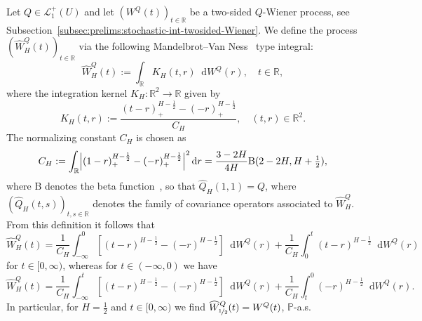 \documentclass[reqno]{amsart}
\numberwithin{equation}{section}
\newcommand{\bbP}{\mathbb{P}}
\newcommand{\bbR}{\mathbb{R}}
\newcommand{\R}{\mathbb{R}}
\newcommand{\rd}{\mathop{}\!\mathrm{d}}
\newcommand{\from}{\colon}
\newcommand{\LO}{\mathscr L}
\theoremstyle{remark}
\theoremstyle{definition}
\begin{document}
Let $Q \in \LO_1^+(U)$ and let $(W^Q(t))_{t\in\bbR}$ be a two-sided $Q$-Wiener process, see 
Subsection~\ref{subsec:prelims:stochastic-int-twosided-Wiener}.
We define the process $(\widehat W^Q_H(t))_{t\in\bbR}$ via
the following Mandelbrot--Van Ness~\cite{MandelbrotVanNess1968} type integral:
%
\begin{equation}\label{eq:WQH}
	\widehat W_H^Q(t) 
	:=
	\int_\bbR K_H(t,r) \rd W^Q(r), \quad t \in \R,
\end{equation}
%
where the
integration kernel $K_H \from \R^2 \to \R$ given by
%
\begin{equation}\label{eq:Mandelbrot-vanNess-int-kern}
	K_H(t,r) := \frac{(t-r)^{H-\frac{1}{2}}_+ - (-r)_+^{H-\frac{1}{2}}}{C_H}, 
	\quad 
	(t,r) \in \R^2.
\end{equation}
%
The normalizing constant $C_H$ is chosen as
%
\[
C_H := 
\int_\R \Bigl\vert(1-r)_+^{H-\frac{1}{2}} - (-r)^{H-\frac{1}{2}}_+ \Bigr\vert^2 \rd r 
=
\frac{3 - 2H}{4H} \mathrm B(2 - 2H, H + \tfrac{1}{2}),
\]
%
where $\mathrm B$ denotes the beta function~\cite[Theorem~B.1]{Picard2011},
so that $\widehat Q_H(1,1) = Q$, where $(\widehat Q_H(t,s))_{t,s\in\bbR}$
denotes the family of covariance operators associated to $\widehat W^Q_H$.
From this definition it follows that
%
\begin{equation}
	\widehat W^Q_H(t) 
	=
	\frac{1}{C_H}\int_{-\infty}^0 [(t-r)^{H - \frac{1}{2}} - (-r)^{H - \frac{1}{2}}] \rd W^Q(r)
	+
	\frac{1}{C_H}\int_0^t (t - r)^{H - \frac{1}{2}} \rd W^Q(r)
\end{equation}
%
for $t \in [0,\infty)$, whereas for $t \in (-\infty, 0)$ we have
%
\begin{equation}
	\widehat W^Q_H(t) 
	=
	\frac{1}{C_H}\int_{-\infty}^t [(t-r)^{H - \frac{1}{2}} - (-r)^{H - \frac{1}{2}}] \rd W^Q(r)
	+
	\frac{1}{C_H}\int_t^0 ( - r)^{H - \frac{1}{2}} \rd W^Q(r).
\end{equation}
%
In particular, for $H = \frac{1}{2}$ and $t \in [0,\infty)$ 
we find $\widehat W^Q_{\nicefrac{1}{2}}(t) = W^Q(t)$, $\bbP$-a.s.
\end{document}
